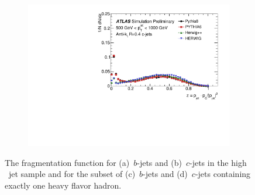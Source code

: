 \begin{figure}
\begin{subfigure}[]{0.45\textwidth}
\end{subfigure}
 \begin{subfigure}[]{0.45\textwidth}
\includegraphics[width=\textwidth]{evtgen/figures/Frag/Jz4/WithIsolation/h_CFrag_SingleHad.pdf}
\end{subfigure}

\caption{The fragmentation function for (a)~$b$-jets and (b)~$c$-jets in the 
high \pT\ jet sample and for the subset
of (c)~$b$-jets and (d)~$c$-jets containing exactly one heavy flavor hadron.
}
\label{fig:jz4frag}
\end{figure}
\begin{table}
\hfill
{}
\caption{The mean fragmentation function for (a)~$b$-jets and $c$-jets in the 
high \pT~jet sample and for the subset
of (b)~$b$-jets and ~$c$-jets 
satisfying the additional requirement that there be no other weakly decaying
heavy flavor hadron with $\pt>5.0$~\GeV\ within a cone $\Delta R=1$ of the jet.}
\label{t:jz4frag}
\end{table}
